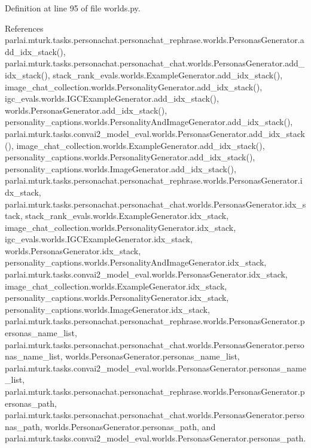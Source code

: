 Definition at line 95 of file worlds.\+py.



References parlai.\+mturk.\+tasks.\+personachat.\+personachat\+\_\+rephrase.\+worlds.\+Personas\+Generator.\+add\+\_\+idx\+\_\+stack(), parlai.\+mturk.\+tasks.\+personachat.\+personachat\+\_\+chat.\+worlds.\+Personas\+Generator.\+add\+\_\+idx\+\_\+stack(), stack\+\_\+rank\+\_\+evals.\+worlds.\+Example\+Generator.\+add\+\_\+idx\+\_\+stack(), image\+\_\+chat\+\_\+collection.\+worlds.\+Personality\+Generator.\+add\+\_\+idx\+\_\+stack(), igc\+\_\+evals.\+worlds.\+I\+G\+C\+Example\+Generator.\+add\+\_\+idx\+\_\+stack(), worlds.\+Personas\+Generator.\+add\+\_\+idx\+\_\+stack(), personality\+\_\+captions.\+worlds.\+Personality\+And\+Image\+Generator.\+add\+\_\+idx\+\_\+stack(), parlai.\+mturk.\+tasks.\+convai2\+\_\+model\+\_\+eval.\+worlds.\+Personas\+Generator.\+add\+\_\+idx\+\_\+stack(), image\+\_\+chat\+\_\+collection.\+worlds.\+Example\+Generator.\+add\+\_\+idx\+\_\+stack(), personality\+\_\+captions.\+worlds.\+Personality\+Generator.\+add\+\_\+idx\+\_\+stack(), personality\+\_\+captions.\+worlds.\+Image\+Generator.\+add\+\_\+idx\+\_\+stack(), parlai.\+mturk.\+tasks.\+personachat.\+personachat\+\_\+rephrase.\+worlds.\+Personas\+Generator.\+idx\+\_\+stack, parlai.\+mturk.\+tasks.\+personachat.\+personachat\+\_\+chat.\+worlds.\+Personas\+Generator.\+idx\+\_\+stack, stack\+\_\+rank\+\_\+evals.\+worlds.\+Example\+Generator.\+idx\+\_\+stack, image\+\_\+chat\+\_\+collection.\+worlds.\+Personality\+Generator.\+idx\+\_\+stack, igc\+\_\+evals.\+worlds.\+I\+G\+C\+Example\+Generator.\+idx\+\_\+stack, worlds.\+Personas\+Generator.\+idx\+\_\+stack, personality\+\_\+captions.\+worlds.\+Personality\+And\+Image\+Generator.\+idx\+\_\+stack, parlai.\+mturk.\+tasks.\+convai2\+\_\+model\+\_\+eval.\+worlds.\+Personas\+Generator.\+idx\+\_\+stack, image\+\_\+chat\+\_\+collection.\+worlds.\+Example\+Generator.\+idx\+\_\+stack, personality\+\_\+captions.\+worlds.\+Personality\+Generator.\+idx\+\_\+stack, personality\+\_\+captions.\+worlds.\+Image\+Generator.\+idx\+\_\+stack, parlai.\+mturk.\+tasks.\+personachat.\+personachat\+\_\+rephrase.\+worlds.\+Personas\+Generator.\+personas\+\_\+name\+\_\+list, parlai.\+mturk.\+tasks.\+personachat.\+personachat\+\_\+chat.\+worlds.\+Personas\+Generator.\+personas\+\_\+name\+\_\+list, worlds.\+Personas\+Generator.\+personas\+\_\+name\+\_\+list, parlai.\+mturk.\+tasks.\+convai2\+\_\+model\+\_\+eval.\+worlds.\+Personas\+Generator.\+personas\+\_\+name\+\_\+list, parlai.\+mturk.\+tasks.\+personachat.\+personachat\+\_\+rephrase.\+worlds.\+Personas\+Generator.\+personas\+\_\+path, parlai.\+mturk.\+tasks.\+personachat.\+personachat\+\_\+chat.\+worlds.\+Personas\+Generator.\+personas\+\_\+path, worlds.\+Personas\+Generator.\+personas\+\_\+path, and parlai.\+mturk.\+tasks.\+convai2\+\_\+model\+\_\+eval.\+worlds.\+Personas\+Generator.\+personas\+\_\+path.



